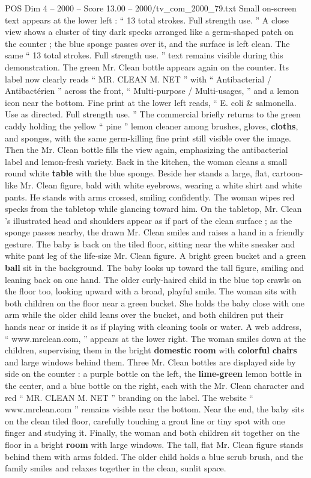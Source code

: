 \begin{textsample}{POS Dim 4 – 2000 – Score 13.00 – 2000/tv\_com\_2000\_79.txt}
Small on-screen text appears at the lower left : “ 13 total strokes.
Full strength use. ” A close view shows a cluster of tiny dark specks arranged like a germ-shaped patch on the counter ; the blue sponge passes over it, and the surface is left clean.
The same “ 13 total strokes.
Full strength use. ” text remains visible during this demonstration.
The green Mr.
Clean bottle appears again on the counter.
Its label now clearly reads “ MR.
CLEAN M.
NET ” with “ Antibacterial / Antibactérien ” across the front, “ Multi-purpose / Multi-usages, ” and a lemon icon near the bottom.
Fine print at the lower left reads, “ E. coli \& salmonella.
Use as directed.
Full strength use. ” The commercial briefly returns to the green caddy holding the yellow “ pine ” lemon cleaner among brushes, gloves, \textbf{cloths}, and sponges, with the same germ-killing fine print still visible over the image.
Then the Mr.
Clean bottle fills the view again, emphasizing the antibacterial label and lemon-fresh variety.
Back in the kitchen, the woman cleans a small round white \textbf{table} with the blue sponge.
Beside her stands a large, flat, cartoon-like Mr.
Clean figure, bald with white eyebrows, wearing a white shirt and white pants.
He stands with arms crossed, smiling confidently.
The woman wipes red specks from the tabletop while glancing toward him.
On the tabletop, Mr.
Clean ’s illustrated head and shoulders appear as if part of the clean surface ; as the sponge passes nearby, the drawn Mr.
Clean smiles and raises a hand in a friendly gesture.
The baby is back on the tiled floor, sitting near the white sneaker and white pant leg of the life-size Mr.
Clean figure.
A bright green bucket and a green \textbf{ball} sit in the background.
The baby looks up toward the tall figure, smiling and leaning back on one hand.
The older curly-haired child in the blue top crawls on the floor too, looking upward with a broad, playful smile.
The woman sits with both children on the floor near a green bucket.
She holds the baby close with one arm while the older child leans over the bucket, and both children put their hands near or inside it as if playing with cleaning tools or water.
A web address, “ www.mrclean.com, ” appears at the lower right.
The woman smiles down at the children, supervising them in the bright \textbf{domestic} \textbf{room} with \textbf{colorful} \textbf{chairs} and large windows behind them.
Three Mr.
Clean bottles are displayed side by side on the counter : a purple bottle on the left, the \textbf{lime-green} lemon bottle in the center, and a blue bottle on the right, each with the Mr.
Clean character and red “ MR.
CLEAN M.
NET ” branding on the label.
The website “ www.mrclean.com ” remains visible near the bottom.
Near the end, the baby sits on the clean tiled floor, carefully touching a grout line or tiny spot with one finger and studying it.
Finally, the woman and both children sit together on the floor in a bright \textbf{room} with large windows.
The tall, flat Mr.
Clean figure stands behind them with arms folded.
The older child holds a blue scrub brush, and the family smiles and relaxes together in the clean, sunlit space.

\end{textsample}
